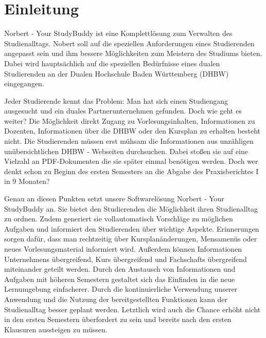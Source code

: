 
\chapter{Einleitung}
Norbert - Your StudyBuddy ist eine Komplettlösung zum Verwalten des Studienalltags. Nobert soll auf die speziellen Anforderungen eines Studierenden angepasst sein und ihm bessere Möglichkeiten zum Meistern des Studiums bieten. Dabei wird hauptsächlich auf die speziellen Bedürfnisse eines dualen Studierenden an der Dualen Hochschule Baden Württemberg (DHBW) eingegangen.

Jeder Studierende kennt das Problem: Man hat sich einen Studiengang ausgesucht und ein duales Partnerunternehmen gefunden. Doch wie geht es weiter? Die Möglichkeit direkt Zugang zu Vorlesungsinhalten, Informationen zu Dozenten, Informationen über die DHBW oder den Kursplan zu erhalten besteht nicht. Die Studierenden müssen erst mühsam die Informationen aus unzähligen unübersichtlichen DHBW - Webseiten durchsuchen. Dabei stoßen sie auf eine Vielzahl an PDF-Dokumenten die sie später einmal benötigen werden. Doch wer denkt schon zu Beginn des ersten Semesters an die Abgabe des Praxisberichtes I in 9 Monaten?

Genau an diesen Punkten setzt unsere Softwarelösung Norbert -  Your StudyBuddy an. Sie bietet den Studierenden die Möglichkeit ihren Studienalltag zu ordnen. Zudem generiert sie vollautomatisch Vorschläge zu möglichen Aufgaben und informiert den Studierenden über wichtige Aspekte. Erinnerungen sorgen dafür, dass man rechtzeitig über Kursplanänderungen, Mensamenüs oder neues Vorlesungsmaterial informiert wird. Außerdem können Informationen Unternehmens übergreifend, Kurs übergreifend und Fachschafts übergreifend miteinander geteilt werden. Durch den Austausch von Informationen und Aufgaben mit höheren Semestern gestaltet sich das Einfinden in die neue Lernumgebung einfacherer. Durch die kontinuierliche Verwendung unserer Anwendung und die Nutzung der bereitgestellten Funktionen kann der Studienalltag besser geplant werden. Letztlich wird auch die Chance erhöht nicht in den ersten Semestern überfordert zu sein und bereits nach den ersten Klausuren aussteigen zu müssen. 
